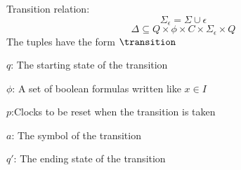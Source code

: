 
\begin{definition}\label{definition:transition}
    \cite*{Eugene2001}
    Transition relation:
    $$\Sigma_\epsilon=\Sigma\cup{\epsilon}$$
    $$\Delta\subseteq Q\times\phi\times C\times\Sigma_\epsilon\times Q$$
The tuples have the form $\transition$

$q$: The starting state of the transition

$\phi$: A set of boolean formulas written like $x\in I$

$p$:Clocks to be reset when the transition is taken

$a$: The symbol of the transition

$q'$: The ending state of the transition
\end{definition}